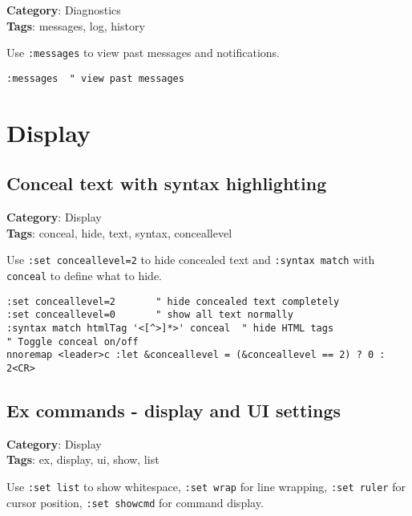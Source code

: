 {{{{\textbf{Category}: Diagnostics\\ \textbf{Tags}: messages, log, history
\vspace{0.5cm}

Use {\footnotesize \Verb§:messages§} to view past messages and notifications.

\begin{Exa*}{}
\begin{Verbatim}[fontsize=\footnotesize, breaklines, breakanywhere]
:messages  " view past messages
\end{Verbatim}
\end{Exa*}

\chapter{Display}
\section{Conceal text with syntax highlighting}

\textbf{Category}: Display\\ \textbf{Tags}: conceal, hide, text, syntax, conceallevel
\vspace{0.5cm}

Use {\footnotesize \Verb§:set conceallevel=2§} to hide concealed text and {\footnotesize \Verb§:syntax match§} with {\footnotesize \Verb§conceal§} to define what to hide.

\begin{Exa*}{}
\begin{Verbatim}[fontsize=\footnotesize, breaklines, breakanywhere]
:set conceallevel=2       " hide concealed text completely
:set conceallevel=0       " show all text normally
:syntax match htmlTag '<[^>]*>' conceal  " hide HTML tags
" Toggle conceal on/off
nnoremap <leader>c :let &conceallevel = (&conceallevel == 2) ? 0 : 2<CR>
\end{Verbatim}
\end{Exa*}

\section{Ex commands - display and UI settings}

\textbf{Category}: Display\\ \textbf{Tags}: ex, display, ui, show, list
\vspace{0.5cm}

Use {\footnotesize \Verb§:set list§} to show whitespace, {\footnotesize \Verb§:set wrap§} for line wrapping, {\footnotesize \Verb§:set ruler§} for cursor position, {\footnotesize \Verb§:set showcmd§} for command display.

}}}}
